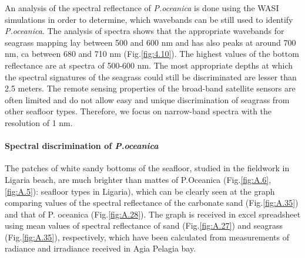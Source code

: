 \documentclass[11pt]{article}
\begin{document}
An analysis of the spectral reflectance of \textit{P.oceanica} is done using the WASI simulations in order to
determine, which wavebands can be still used to identify \textit{P.oceanica}. The analysis of spectra shows
that the appropriate wavebands for seagrass mapping lay between 500 and 600 nm and has
also peaks at around 700 nm, ca between 680 and 710 nm (Fig.\ref{fig:4.10}). The highest values of the bottom
reflectance are at spectra of 500-600 nm. The most appropriate depths at which the spectral signatures of the seagrass
could still be discriminated are lesser than 2.5 meters.
The remote sensing properties of the broad-band satellite sensors are often limited and do not allow
easy and unique discrimination of seagrass from other seafloor types. Therefore, we focus on narrow-band
spectra with the resolution of 1 nm.

\paragraph{Spectral discrimination of \textit{P.oceanica}}
The patches of white sandy bottoms of the seafloor, studied in the fieldwork in Ligaria beach, are
much brighter than mattes of P.Oceanica (Fig.\ref{fig:A.6}, \ref{fig:A.5}): seafloor types in Ligaria), which can be clearly seen
at the graph comparing values of the spectral reflectance of the carbonate sand (Fig.\ref{fig:A.35}) and that of P.
oceanica (Fig.\ref{fig:A.28}).
The graph is received in excel spreadsheet using mean values of spectral reflectance of
sand (Fig.\ref{fig:A.27}) and seagrass (Fig.\ref{fig:A.35}), respectively, which have been calculated from measurements of radiance and
irradiance received in Agia Pelagia bay.
\end{document}
